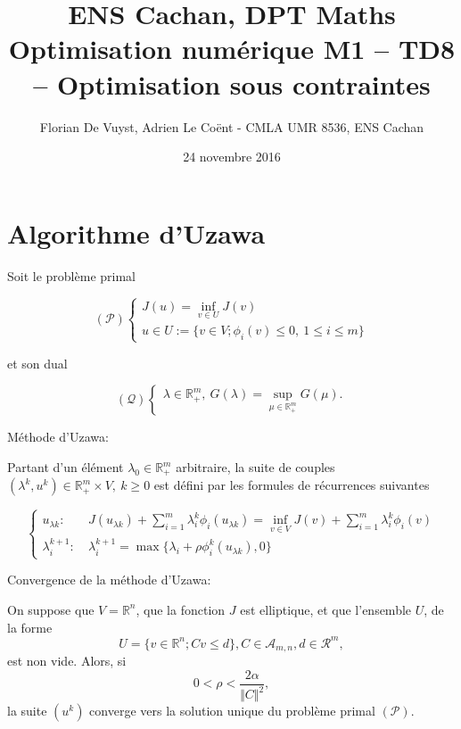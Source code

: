 \documentclass[11pt, a4paper]{article}
\title{ENS Cachan, DPT Maths \\ [1cm]
Optimisation numérique M1 -- TD8 -- Optimisation sous contraintes}
\date{24 novembre 2016}
\author{Florian De Vuyst, Adrien Le Co\"ent - CMLA UMR 8536, ENS Cachan}
\begin{document}
%
\maketitle
%
\section*{Algorithme d'Uzawa}
%
Soit le problème primal 

\begin{equation}
(\mathcal{P})\left\lbrace
\begin{array}{c}
\displaystyle J(u) = \inf_{v\in U} J(v)\\
u \in U := \lbrace v \in V; \phi_i(v) \leq 0, ~ 1 \leq i \leq m\rbrace 
\end{array}
\right.
\end{equation}

et son dual 

\begin{equation}
(\mathcal{Q})\left\lbrace
\begin{array}{c}
\displaystyle \lambda \in \mathbb{R}^m_{+}, ~ G(\lambda) = \sup_{\mu \in \mathbb{R}^m_{+}} G(\mu).
\end{array}
\right.
\end{equation}

Méthode d'Uzawa:

Partant d'un élément $\lambda_0 \in \mathbb{R}^m_+$ arbitraire, la suite de couples $(\lambda^k, u^k) \in \mathbb{R}^m_+ \times V, ~ k\geq 0$ est défini par les formules de récurrences suivantes

\begin{equation}
\left\lbrace
\begin{array}{cc}
\displaystyle u_{\lambda k}:& ~ J(u_{\lambda k}) + \sum_{i=1}^{m}{\lambda_i^k \phi_i (u_{\lambda k})} = \inf_{v \in V}{J(v) + \sum_{i=1}^{m}{\lambda_i^k \phi_i (v)}}\\
\lambda_i^{k+1}:&~ \lambda_i^{k+1} = \max{\lbrace \lambda_i + \rho \phi_i^k(u_{\lambda k}), 0\rbrace}
\end{array}
\right.
\end{equation}

Convergence de la méthode d'Uzawa:

On suppose que $V=\mathbb{R}^n$, que la fonction $J$ est elliptique, et que l'ensemble $U$, de la forme 
$$
U = \lbrace v \in \mathbb{R}^n; Cv \leq d\rbrace, C \in \mathcal{A}_{m,n}, d \in \mathcal{R}^m,
$$
est non vide. Alors, si
$$
0<\rho <\frac{2\alpha}{\Vert C\Vert^2},
$$
la suite $(u^k)$ converge vers la solution unique du problème primal $(\mathcal{P})$.
\end{document}
